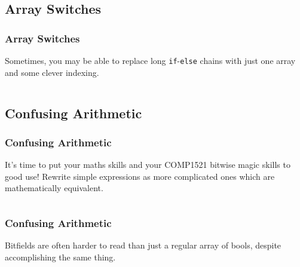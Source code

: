 \documentclass[handout,xcolor]{beamer}
\begin{document}
\subsection{Array Switches}

\begin{frame}
	\frametitle{Array Switches}
	\pause
	
	Sometimes, you may be able to replace long \texttt{if}-\texttt{else} chains with just one array and some clever indexing.
	\pause
	
	\begin{columns}
		\begin{column}{0.45\textwidth}
			\centering
			
		\end{column}
		\pause
		
		\begin{column}{0.45\textwidth}
			\centering
			
		\end{column}
	\end{columns}
\end{frame}

\subsection{Confusing Arithmetic}

\begin{frame}
	\frametitle{Confusing Arithmetic}
	\pause
	
	It's time to put your maths skills and your COMP1521 bitwise magic skills to good use! \pause Rewrite simple expressions as more complicated ones which are mathematically equivalent.
	\pause
	
	\begin{columns}
		\begin{column}{0.45\textwidth}
			\centering
			
		\end{column}
		\pause
		\begin{column}{0.45\textwidth}
			\centering
			
		\end{column}
	\end{columns}
\end{frame}

\begin{frame}
	\frametitle{Confusing Arithmetic}
	\pause
	
	Bitfields are often harder to read than just a regular array of bools, despite accomplishing the same thing.
	\pause
	
	\begin{columns}
		\begin{column}{0.45\textwidth}
			\centering
			
		\end{column}
		\pause
		
		\begin{column}{0.45\textwidth}
			\centering
			
		\end{column}
	\end{columns}
\end{frame}
\end{document}
